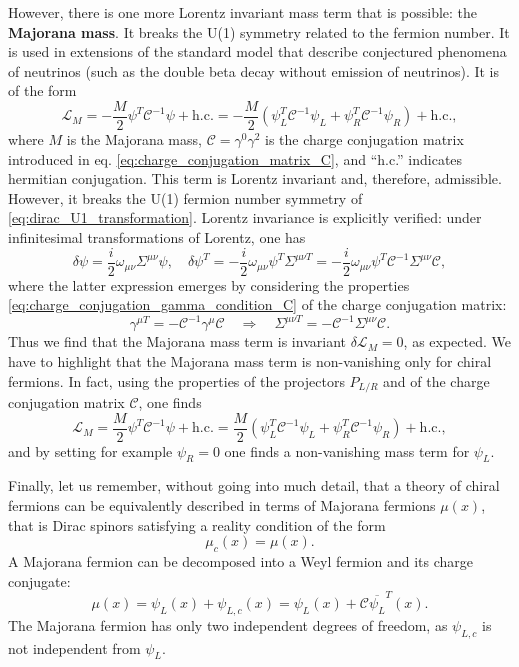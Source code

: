 However, there is one more Lorentz invariant mass term that is possible: the \textbf{Majorana mass}. It breaks the U(1) symmetry related to the fermion number. It is used in extensions of the standard model that describe conjectured phenomena of neutrinos (such as the double beta decay without emission of neutrinos). It is of the form
\[
    \mathcal{L}_M = - \frac{M}{2} \psi^T \mathcal{C}^{-1} \psi + \text{h.c.} = - \frac{M}{2} (\psi_L^T \mathcal{C}^{-1} \psi_L + \psi_R^T \mathcal{C}^{-1} \psi_R) + \text{h.c.},
\]
where \(M\) is the Majorana mass, \(\mathcal{C} = \gamma^0 \gamma^2\) is the charge conjugation matrix introduced in eq. \eqref{eq:charge_conjugation_matrix_C}, and “h.c.” indicates hermitian conjugation. This term is Lorentz invariant and, therefore, admissible. However, it breaks the U(1) fermion number symmetry of \eqref{eq:dirac_U1_transformation}. Lorentz invariance is explicitly verified: under infinitesimal transformations of Lorentz, one has
\[
    \delta \psi = \frac{i}{2} \omega_{\mu \nu} \Sigma^{\mu \nu} \psi, \quad \delta \psi^T = - \frac{i}{2} \omega_{\mu \nu} \psi^T \Sigma^{\mu \nu T} = -\frac{i}{2} \omega_{\mu \nu} \psi^T \mathcal{C}^{-1} \Sigma^{\mu \nu} \mathcal{C},
\]
where the latter expression emerges by considering the properties \eqref{eq:charge_conjugation_gamma_condition_C} of the charge conjugation matrix:
\[
    \gamma^{\mu T} = - \mathcal{C}^{-1} \gamma^{\mu} \mathcal{C} \quad \Longrightarrow \quad \Sigma^{\mu \nu T} = - \mathcal{C}^{-1} \Sigma^{\mu \nu} \mathcal{C}.
\]
Thus we find that the Majorana mass term is invariant \(\delta \mathcal{L}_M = 0\), as expected. We have to highlight that the Majorana mass term is non-vanishing only for chiral fermions. In fact, using the properties of the projectors \(P_{L/R}\) and of the charge conjugation matrix \(\mathcal{C}\), one finds
\[
    \mathcal{L}_M = \frac{M}{2} \psi^T \mathcal{C}^{-1} \psi + \text{h.c.} = \frac{M}{2}(\psi_L^T \mathcal{C}^{-1} \psi_L + \psi_R^T \mathcal{C}^{-1} \psi_R) + \text{h.c.},
\]
and by setting for example \(\psi_R = 0\) one finds a non-vanishing mass term for \(\psi_L\).

Finally, let us remember, without going into much detail, that a theory of chiral fermions can be equivalently described in terms of Majorana fermions \(\mu(x)\), that is Dirac spinors satisfying a reality condition of the form
\[
    \mu_c (x) = \mu(x).
\]
A Majorana fermion can be decomposed into a Weyl fermion and its charge conjugate:
\[
    \mu(x) = \psi_L (x) + \psi_{L,c} (x) = \psi_L (x) + \mathcal{C} \overline{\psi_L}^T (x).
\]
The Majorana fermion has only two independent degrees of freedom, as \(\psi_{L,c}\) is not independent from \(\psi_L\).


